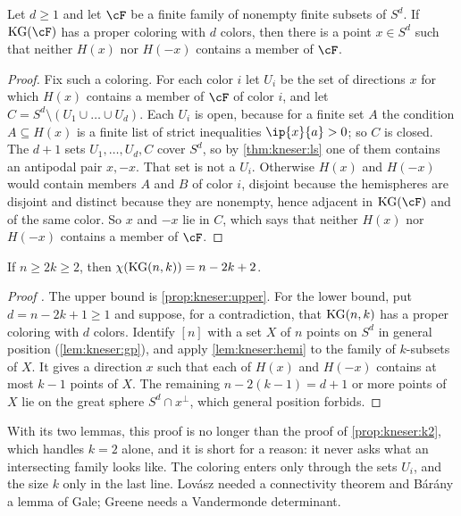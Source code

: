 \begin{refsection}
\begin{lemma}[Hemispheres]\label{lem:kneser:hemi}
Let $d\ge1$ and let $\cF$ be a finite family of nonempty finite subsets of $S^d$. If $\kneserKG(\cF)$ has a proper coloring with $d$ colors, then there is a point $x\in S^d$ such that neither $H(x)$ nor $H(-x)$ contains a member of $\cF$.
\end{lemma}

\begin{proof}
Fix such a coloring. For each color $i$ let $U_i$ be the set of directions $x$ for which $H(x)$ contains a member of $\cF$ of color $i$, and let $C=S^d\setminus(U_1\cup\dots\cup U_d)$. Each $U_i$ is open, because for a finite set $A$ the condition $A\subseteq H(x)$ is a finite list of strict inequalities $\ip{x}{a}>0$; so $C$ is closed. The $d+1$ sets $U_1,\dots,U_d,C$ cover $S^d$, so by \cref{thm:kneser:ls} one of them contains an antipodal pair $x,-x$. That set is not a $U_i$. Otherwise $H(x)$ and $H(-x)$ would contain members $A$ and $B$ of color $i$, disjoint because the hemispheres are disjoint and distinct because they are nonempty, hence adjacent in $\kneserKG(\cF)$ and of the same color. So $x$ and $-x$ lie in $C$, which says that neither $H(x)$ nor $H(-x)$ contains a member of $\cF$.
\end{proof}

\begin{theorem}\label{thm:kneser:kneser}
If $n\ge2k\ge2$, then $\chi(\mathrm{KG}(n,k))=n-2k+2$.
\end{theorem}

\begin{proof}[Proof \parencite{Greene2002}]
The upper bound is \cref{prop:kneser:upper}. For the lower bound, put $d=n-2k+1\ge1$ and suppose, for a contradiction, that $\mathrm{KG}(n,k)$ has a proper coloring with $d$ colors. Identify $[n]$ with a set $X$ of $n$ points on $S^d$ in general position (\cref{lem:kneser:gp}), and apply \cref{lem:kneser:hemi} to the family of $k$-subsets of $X$. It gives a direction $x$ such that each of $H(x)$ and $H(-x)$ contains at most $k-1$ points of $X$. The remaining $n-2(k-1)=d+1$ or more points of $X$ lie on the great sphere $S^d\cap x^\perp$, which general position forbids.
\end{proof}

With its two lemmas, this proof is no longer than the proof of \cref{prop:kneser:k2}, which handles $k=2$ alone, and it is short for a reason: it never asks what an intersecting family looks like. The coloring enters only through the sets $U_i$, and the size $k$ only in the last line. Lov\'asz needed a connectivity theorem and B{\'a}r{\'a}ny a lemma of Gale; Greene needs a Vandermonde determinant.


\end{refsection}
